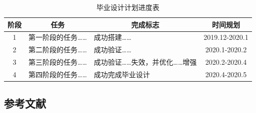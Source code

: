 \documentclass{article}
\begin{document}
\begin{table}[!ht]
  \centering
  \caption{毕业设计计划进度表}
  \label{tab:progress}
  \begin{tabular}{@{}cllc@{}}
    \toprule
    阶段 & \multicolumn{1}{c}{任务} & \multicolumn{1}{c}{完成标志} & 时间规划       \\ \midrule
    1    & 第一阶段的任务……          & 成功搭建……                    & 2019.12-2020.1 \\ \midrule
    2    & 第二阶段的任务……          & 成功验证……                    & 2020.1-2020.2  \\ \midrule
    3    & 第三阶段的任务……          & 成功验证……失效，并优化……增强  & 2020.2-2020.4  \\ \midrule
    4    & 第四阶段的任务……          & 成功完成毕业设计              & 2020.4-2020.5  \\ \bottomrule
  \end{tabular}
\end{table}


\newpage
\setcounter{secnumdepth}{0}  %
\begin{center}
    \section{参考文献}
\end{center}


\printbibliography[heading=none]
\end{document}
